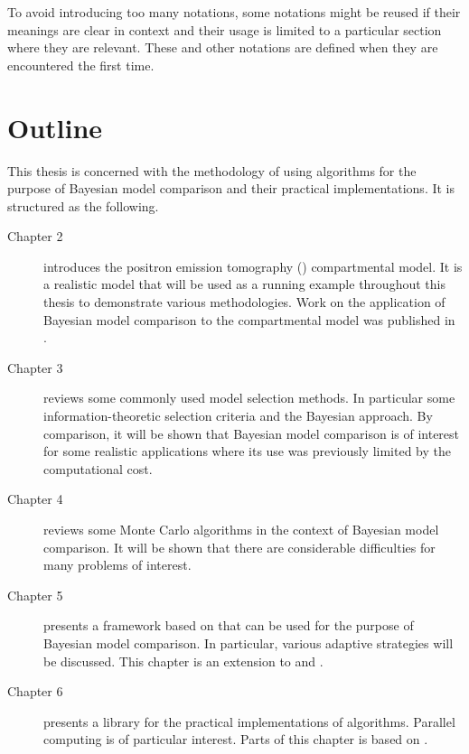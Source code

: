 To avoid introducing too many notations, some notations might be reused if their meanings are clear in context and their usage is limited to a particular section where they are relevant. These and other notations are defined when they are encountered the first time.

\section{Outline}
\label{sec:Outline}

This thesis is concerned with the methodology of using \smc algorithms for the purpose of Bayesian model comparison and their practical implementations. It is structured as the following.
\begin{description}
  \item[Chapter 2] introduces the positron emission tomography (\pet) compartmental model. It is a realistic model that will be used as a running example throughout this thesis to demonstrate various methodologies. Work on the application of Bayesian model comparison to the \pet compartmental model was published in \cite{Zhou2013}.
  \item[Chapter 3] reviews some commonly used model selection methods. In particular some information-theoretic selection criteria and the Bayesian approach. By comparison, it will be shown that Bayesian model comparison is of interest for some realistic applications where its use was previously limited by the computational cost.
  \item[Chapter 4] reviews some Monte Carlo algorithms in the context of Bayesian model comparison. It will be shown that there are considerable difficulties for many problems of interest.
  \item[Chapter 5] presents a framework based on \smc that can be used for the purpose of Bayesian model comparison. In particular, various adaptive strategies will be discussed. This chapter is an extension to \cite{Zhou:2013vx} and \cite{Zhou:2012uz}.
  \item[Chapter 6] presents a \cpp library for the practical implementations of \smc algorithms. Parallel computing is of particular interest. Parts of this chapter is based on \cite{vsmcjss}.
\end{description}
